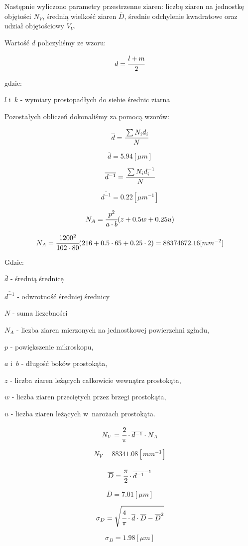 \documentclass[a4paper,12pt]{article}
\begin{document}
Następnie wyliczono parametry przestrzenne ziaren: liczbę ziaren na jednostkę objętości $N_V$, średnią wielkość ziaren $\overline{D}$, średnie odchylenie kwadratowe oraz udział objętościowy $V_V$.

Wartość $d$ policzyliśmy ze wzoru:

$$d=\cfrac{l+m}{2}$$

gdzie:

$l$ i~$k$ - wymiary prostopadłych do siebie średnic ziarna





Pozostałych obliczeń dokonaliśmy za pomocą wzorów:

$$\overline{d}=\cfrac{\sum N_id_i}{N}$$

$$\overline{d}=5.94[\mu m]$$

$$\overline{d^{-1}}=\cfrac{\sum N_id_i^{-1}}{N}$$

$$\overline{d^{-1}}=0.22[\mu m^{-1}]$$

$$N_A=\cfrac{p^2}{a\cdot b}(z+0.5w+0.25u)$$

$$N_A=\cfrac{1200^2}{102\cdot 80}(216+0.5\cdot 65+0.25\cdot 2)=88374672.16[mm^{-2}]$$

Gdzie:

$\overline{d}$ - średnią średnicę

$\overline{d^{-1}}$ - odwrotność średniej średnicy

$N$ - suma liczebności

$N_A$ - liczba ziaren mierzonych na jednostkowej powierzchni zgładu,

$p$ - powiększenie mikroskopu,

$a$ i~$b$ - długość boków prostokąta,

$z$ - liczba ziaren leżących całkowicie wewnątrz prostokąta,

$w$ - liczba ziaren przeciętych przez brzegi prostokąta,

$u$ - liczba ziaren leżących w~narożach prostokąta.

$$N_V=\cfrac{2}{\pi}\cdot \overline{d^{-1}} \cdot N_A$$

$$N_V=88341.08[mm^{-3}]$$

$$\overline{D}=\cfrac{\pi}{2}\cdot \overline{d^{-1}}^{-1}$$

$$\overline{D}=7.01[\mu m]$$

$$\sigma_D=\sqrt{\cfrac{4}{\pi}\cdot \overline{d}\cdot \overline{D} - \overline{D}^2}$$

$$\sigma_D=1.98 [\mu m]$$
\end{document}
